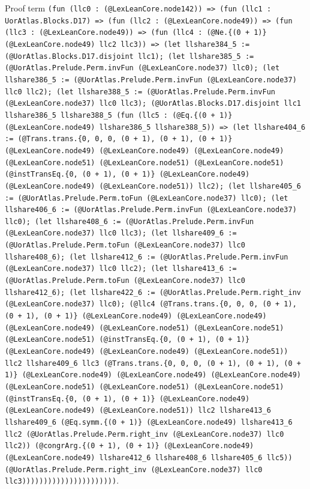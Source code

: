 \documentclass[11pt]{article}
\begin{document}
\noindent Proof term \texttt{(fun (llc0 : (@LexLeanCore.node142)) => (fun (llc1 : UorAtlas.Blocks.D17) => (fun (llc2 : (@LexLeanCore.node49)) => (fun (llc3 : (@LexLeanCore.node49)) => (fun (llc4 : (@Ne.\{(0 + 1)\} (@LexLeanCore.node49) llc2 llc3)) => (let llshare384\_5 := (@UorAtlas.Blocks.D17.disjoint llc1); (let llshare385\_5 := (@UorAtlas.Prelude.Perm.invFun (@LexLeanCore.node37) llc0); (let llshare386\_5 := (@UorAtlas.Prelude.Perm.invFun (@LexLeanCore.node37) llc0 llc2); (let llshare388\_5 := (@UorAtlas.Prelude.Perm.invFun (@LexLeanCore.node37) llc0 llc3); (@UorAtlas.Blocks.D17.disjoint llc1 llshare386\_5 llshare388\_5 (fun (llc5 : (@Eq.\{(0 + 1)\} (@LexLeanCore.node49) llshare386\_5 llshare388\_5)) => (let llshare404\_6 := (@Trans.trans.\{0, 0, 0, (0 + 1), (0 + 1), (0 + 1)\} (@LexLeanCore.node49) (@LexLeanCore.node49) (@LexLeanCore.node49) (@LexLeanCore.node51) (@LexLeanCore.node51) (@LexLeanCore.node51) (@instTransEq.\{0, (0 + 1), (0 + 1)\} (@LexLeanCore.node49) (@LexLeanCore.node49) (@LexLeanCore.node51)) llc2); (let llshare405\_6 := (@UorAtlas.Prelude.Perm.toFun (@LexLeanCore.node37) llc0); (let llshare406\_6 := (@UorAtlas.Prelude.Perm.invFun (@LexLeanCore.node37) llc0); (let llshare408\_6 := (@UorAtlas.Prelude.Perm.invFun (@LexLeanCore.node37) llc0 llc3); (let llshare409\_6 := (@UorAtlas.Prelude.Perm.toFun (@LexLeanCore.node37) llc0 llshare408\_6); (let llshare412\_6 := (@UorAtlas.Prelude.Perm.invFun (@LexLeanCore.node37) llc0 llc2); (let llshare413\_6 := (@UorAtlas.Prelude.Perm.toFun (@LexLeanCore.node37) llc0 llshare412\_6); (let llshare422\_6 := (@UorAtlas.Prelude.Perm.right\_inv (@LexLeanCore.node37) llc0); (@llc4 (@Trans.trans.\{0, 0, 0, (0 + 1), (0 + 1), (0 + 1)\} (@LexLeanCore.node49) (@LexLeanCore.node49) (@LexLeanCore.node49) (@LexLeanCore.node51) (@LexLeanCore.node51) (@LexLeanCore.node51) (@instTransEq.\{0, (0 + 1), (0 + 1)\} (@LexLeanCore.node49) (@LexLeanCore.node49) (@LexLeanCore.node51)) llc2 llshare409\_6 llc3 (@Trans.trans.\{0, 0, 0, (0 + 1), (0 + 1), (0 + 1)\} (@LexLeanCore.node49) (@LexLeanCore.node49) (@LexLeanCore.node49) (@LexLeanCore.node51) (@LexLeanCore.node51) (@LexLeanCore.node51) (@instTransEq.\{0, (0 + 1), (0 + 1)\} (@LexLeanCore.node49) (@LexLeanCore.node49) (@LexLeanCore.node51)) llc2 llshare413\_6 llshare409\_6 (@Eq.symm.\{(0 + 1)\} (@LexLeanCore.node49) llshare413\_6 llc2 (@UorAtlas.Prelude.Perm.right\_inv (@LexLeanCore.node37) llc0 llc2)) (@congrArg.\{(0 + 1), (0 + 1)\} (@LexLeanCore.node49) (@LexLeanCore.node49) llshare412\_6 llshare408\_6 llshare405\_6 llc5)) (@UorAtlas.Prelude.Perm.right\_inv (@LexLeanCore.node37) llc0 llc3))))))))))))))))))))))}.\par
\end{document}

